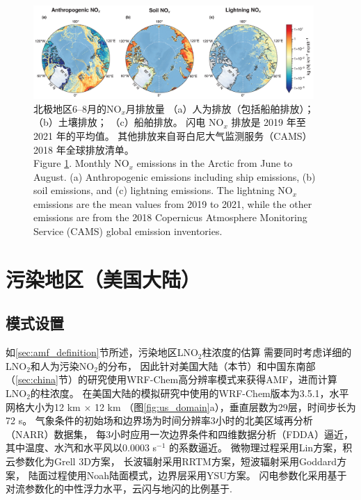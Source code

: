 \begin{figure}[H]
\centering
\includegraphics[width=0.95\textwidth]{./figures/arctic_emission_comp.png}
\caption{
北极地区6--8月的NO$_x$月排放量
（a）人为排放（包括船舶排放）；（b）土壤排放；
（c）船舶排放。
闪电 NO$_x$ 排放是 2019 年至 2021 年的平均值。
其他排放来自哥白尼大气监测服务（CAMS）2018 年全球排放清单。\\
Figure \ref{fig:arctic_emission_comp}. Monthly NO$_x$ emissions in the Arctic from June to August.
(a) Anthropogenic emissions including ship emissions, (b) soil emissions, and (c) lightning emissions.
The lightning NO$_x$ emissions are the mean values from 2019 to 2021, while the other emissions are from the 2018 Copernicus Atmosphere Monitoring Service (CAMS) global emission inventories.
}
\label{fig:arctic_emission_comp}
\end{figure}


\section{污染地区（美国大陆）} \label{sec:us}

\subsection{模式设置} \label{sec:model_settings_us}

如\ref{sec:amf_definition}节所述，污染地区LNO$_2$柱浓度的估算
需要同时考虑详细的LNO$_2$和人为污染NO$_2$的分布，
因此针对美国大陆（本节）和中国东南部（\ref{sec:china}节）的研究使用WRF-Chem高分辨率模式来获得AMF，进而计算LNO$_2$的柱浓度。
在美国大陆的模拟研究中使用的WRF-Chem版本为3.5.1，水平网格大小为12 km $\times$ 12 km （图\ref{fig:us_domain}a），垂直层数为29层，时间步长为72 s。
气象条件的初始场和边界场为时间分辨率3小时的北美区域再分析（NARR）数据集，
每3小时应用一次边界条件和四维数据分析（FDDA）逼近，
其中温度、水汽和水平风以0.0003 s$^{-1}$ 的系数逼近\citep{Laughner.2017}。
微物理过程采用Lin方案\citep{Lin.1983}，积云参数化为Grell 3D方案\citep{Grell.1993a,Grell.2002a}，
长波辐射采用RRTM方案\citep{Iacono.2008}，短波辐射采用Goddard方案，
陆面过程使用Noah陆面模式\citep{Koren.1999}，边界层采用YSU方案\citep{Hong.2006}。
闪电参数化采用基于对流参数化的中性浮力水平\citep{Pickering.1992}，云闪与地闪的比例基于\citet{Boccippio.2001}.

